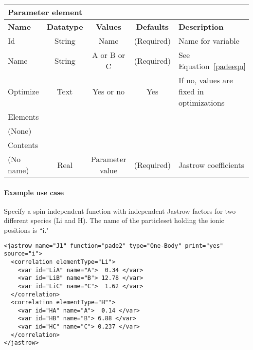 \begin{table}[h]
\begin{center}
\begin{tabular}{l c c c l }
\hline
\multicolumn{5}{l}{Parameter element} \\
\hline
\bfseries Name & \bfseries Datatype & \bfseries Values & \bfseries Defaults & \bfseries Description \\
\hline
Id & String & Name & (Required) & Name for variable \\
Name & String & A or B or C & (Required) & See Equation~\ref{padeeqn}\\
Optimize & Text & Yes or no & Yes & If no, values are fixed in optimizations \\
\hline
\multicolumn{5}{l}{Elements}\\ \hline
(None) & & & \\ \hline
\multicolumn{5}{l}{Contents}\\ \hline
 (No name) & Real & Parameter value & (Required) & Jastrow coefficients \\ \hline
\end{tabular}
\end{center}
\end{table}

\paragraph{Example use case}
\label{sec:1bjpadeexamples}

Specify a spin-independent function with independent Jastrow factors for two different species (Li and H).
The name of the particleset holding the ionic positions is ``i."
\begin{lstlisting}[style=QMCPXML]
<jastrow name="J1" function="pade2" type="One-Body" print="yes" source="i">
  <correlation elementType="Li">
    <var id="LiA" name="A">  0.34 </var>
    <var id="LiB" name="B"> 12.78 </var>
    <var id="LiC" name="C">  1.62 </var>
  </correlation>
  <correlation elementType="H"">
    <var id="HA" name="A">  0.14 </var>
    <var id="HB" name="B"> 6.88 </var>
    <var id="HC" name="C"> 0.237 </var>
  </correlation>
</jastrow>
\end{lstlisting}
